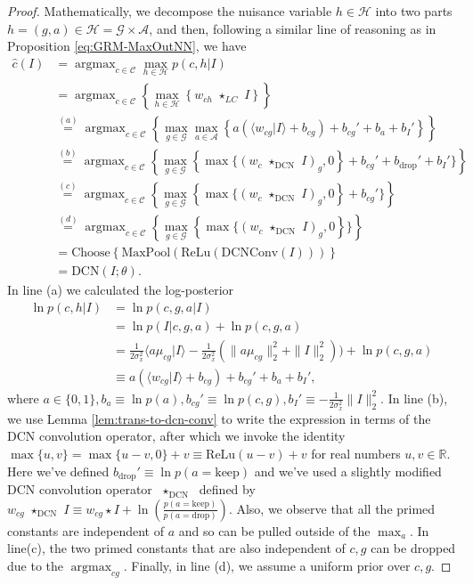 \documentclass[12pt]{article}
\newcommand{\R}[0]{{ \mathbb{R} }}
\DeclareMathOperator*{\argmax}{argmax}
\newcommand{\Cl}[0]{{ \mathcal{C} }}
\newcommand{\G}[0]{{ \mathcal{G} }}
\newcommand{\HH}[0]{{ \mathcal{H} }}
\newcommand{\A}[0]{{ \mathcal{A} }}
\newcommand{\lcmatch}[0]{{ \,\,\star_{LC}\,\, }}
\newcommand{\cnnconv}[0]{{ \,\,\star_{\textrm{DCN}}\,\, }}
\begin{document}
\begin{proof}
Mathematically, we decompose the nuisance variable $h \in \HH$ into two parts $h = (g,a) \in \HH = \G \times \A$, and then, following a similar line of reasoning as in Proposition \ref{eq:GRM-MaxOutNN}, we have
\begin{align*}
	\hat{c}(I)                 &= \argmax_{c \in \Cl} \max_{h \in \HH} p(c,h|I) \\
	                               &= \argmax_{c \in \Cl} \left\{ \max_{h \in \HH}  \left\{ w_{ch} \lcmatch I \right\} \right\} \\
	                               &\overset{(a)}{=} \argmax_{c \in \Cl} \left\{ \max_{g \in \G} \max_{a \in \A}  \left\{ a(\langle w_{cg} | I\rangle + b_{cg})   + b_{cg}' + b_{a} + b_{I}'\right\} \right\} \\
	                               &\overset{(b)}{=} \argmax_{c \in \Cl} \left\{ \max_{g \in \G}  \left\{ \max \{ (w_{c} \cnnconv I)_{g}, 0 \right\} + b_{cg}' + b_{\textrm{drop}}' + b_{I}' \} \right\} \\
	                               &\overset{(c)}{=} \argmax_{c \in \Cl} \left\{ \max_{g \in \G}  \left\{ \max \{ (w_{c} \cnnconv I)_{g}, 0 \right\} + b_{cg}' \} \right\} \\
	                               &\overset{(d)}{=} \argmax_{c \in \Cl} \left\{ \max_{g \in \G}  \left\{ \max \{ (w_{c} \cnnconv I)_{g}, 0 \right\} \} \right\} \\
	                               &= \textrm{Choose} \left\{ \textrm{MaxPool}( \textrm{ReLu} ( \textrm{DCNConv} (I)))  \right\} \\
	                               &= \textrm{DCN}(I; \theta).
\end{align*}
In line (a) we calculated the log-posterior
\begin{align*}
	\ln p(c,h | I)  &= \ln p(c,g,a | I)  \\
			&= \ln p(I | c,g,a)  + \ln p(c,g,a) \\
			&= \frac{1}{2\sigma_x^2} \langle a \mu_{cg} | I \rangle  -\frac{1}{2\sigma_x^2} (\| a \mu_{cg} \|_2^{2} + \| I \|_2^{2})  )  + \ln p(c,g,a)\\
	                 &\equiv  a(\langle w_{cg} | I\rangle + b_{cg}) +  b_{cg}' + b_{a} + b_{I}',
\end{align*}
where $a \in \{0,1\}, b_{a} \equiv \ln p(a), b_{cg}' \equiv \ln p(c,g), b_{I}' \equiv -\frac{1}{2\sigma_x^2} \| I \|_{2}^{2}$. In line (b), we use Lemma \ref{lem:trans-to-dcn-conv} to write the expression in terms of the DCN convolution operator, after which we invoke the identity $\max \{u,v\} = \max \{u-v,0 \}+v \equiv \textrm{ReLu}(u-v) + v$ for real numbers $u,v \in \R$. Here we've defined $b_{\textrm{drop}}' \equiv \ln p(a=\textrm{keep})$ and we've used a slightly modified DCN convolution operator $\cnnconv$ defined by $w_{cg} \cnnconv I \equiv w_{cg} \star I + \ln \left( \frac{p(a=\textrm{keep})}{p(a=\textrm{drop})} \right)$. Also, we observe that all the primed constants are independent of $a$ and so can be pulled outside of the $\max_{a}$. In line(c), the two primed constants that are also independent of $c,g$ can be dropped due to the $\argmax_{cg}$. Finally, in line (d), we assume a uniform prior over $c,g$.

\end{proof}
\end{document}
